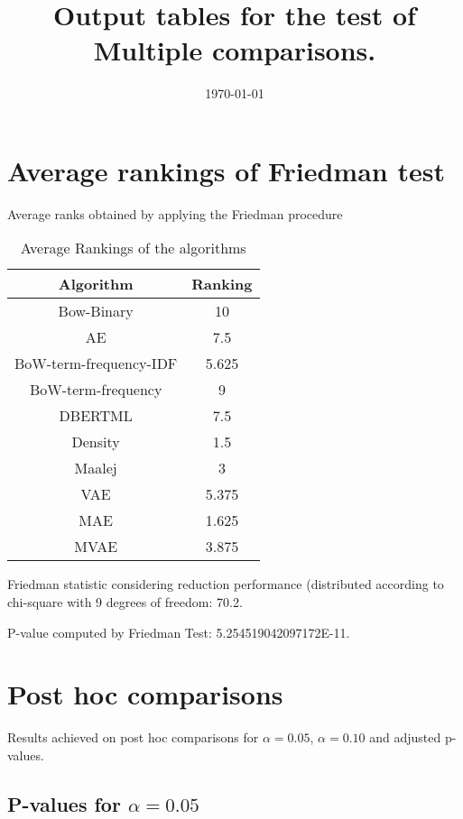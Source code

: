 \documentclass[a4paper,10pt]{article}
\title{Output tables for the test of Multiple comparisons.}
\author{}
\date{\today}
\begin{document}
\begin{landscape}
\pagestyle{empty}
\maketitle
\thispagestyle{empty}
\section{Average rankings of Friedman test}



Average ranks obtained by applying the Friedman procedure

\begin{table}[!htp]
\centering
\begin{tabular}{|c|c|}\hline
Algorithm&Ranking\\\hline
Bow-Binary & 10\\
AE & 7.5\\
BoW-term-frequency-IDF & 5.625\\
BoW-term-frequency & 9\\
DBERTML & 7.5\\
Density & 1.5\\
Maalej & 3\\
VAE & 5.375\\
MAE & 1.625\\
MVAE & 3.875\\
\hline
\end{tabular}
\caption{Average Rankings of the algorithms}
\end{table}

Friedman statistic considering reduction performance (distributed according to chi-square with 9 degrees of freedom: 70.2.

P-value computed by Friedman Test: 5.254519042097172E-11.\newline



\pagebreak

\section{Post hoc comparisons}

Results achieved on post hoc comparisons for $\alpha = 0.05$, $\alpha = 0.10$ and adjusted p-values.

\subsection{P-values for $\alpha=0.05$}


\end{landscape}
\end{document}
